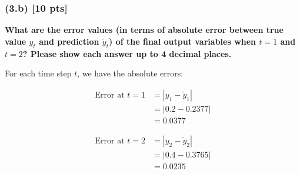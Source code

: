 \subsubsection*{(3.b) [10 pts]} \textbf{What are the error values (in terms of absolute error between true value \( y_t \) and prediction \( \tilde{y}_t \)) of the final output variables when \( t = 1 \) and \( t = 2 \)? Please show each answer up to 4 decimal places.}

For each time step \( t \), we have the absolute errors:

\begin{align}
    \text{Error at } t = 1 &= \left| y_1 - \tilde{y}_1 \right| \nonumber \\
    &= \left| 0.2 - 0.2377 \right| \nonumber \\
    &= 0.0377
\end{align}

\begin{align}
    \text{Error at } t = 2 &= \left| y_2 - \tilde{y}_2 \right| \nonumber \\
    &= \left| 0.4 - 0.3765 \right| \nonumber \\
    &= 0.0235
\end{align}